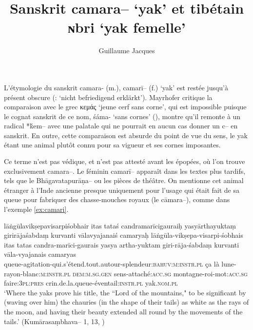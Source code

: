 \documentclass[oldfontcommands,oneside,a4paper,11pt]{article}
\newcommand{\ipa}[1]{{\phon #1}} %
\newcommand{\grec}[1]{{\mleccha #1}}
\begin{document}
 
\title{Sanskrit \ipa{camara--} `yak' et tibétain \ipa{ɴbri} `yak femelle'}
\author{Guillaume Jacques}
\maketitle
L'étymologie du sanskrit \ipa{camara-} (m.), \ipa{camarī--} (f.) `yak' est restée jusqu'à présent obscure (\citealt[I, 375]{mayrhofer56kurz}: `nicht befriedigend erklärkt'). Mayrhofer critique la comparaison avec le grec \grec{κεμάς} `jeune cerf sans corne', qui est impossible puisque le cognat sanskrit de ce nom, \ipa{śáma-} `sans cornes' (\citealt[II, 289]{mayrhofer56kurz}), montre qu'il remonte à un radical *\ipa{ḱem--} avec une palatale qui ne pourrait en aucun cas donner un \ipa{c--} en sanskrit. En outre, cette comparaison est absurde du point de vue du sens, le yak étant une animal plutôt connu pour sa vigueur et ses cornes imposantes.


Ce terme n'est pas védique, et n'est pas attesté avant les épopées, où l'on trouve exclusivement   \ipa{camara--}.  Le féminin \ipa{camarī--} apparaît dans les textes plus tardifs, tels que le \ipa{Bhāgavatapurāṇa--} ou les pièces de théâtre. On mentionne cet animal étranger à l'Inde ancienne presque uniquement pour l'usage qui était fait de sa queue pour fabriquer des chasse-mouches royaux (le  \ipa{cāmara--}), comme dans l'exemple \ref{ex:camari}.

\begin{exe}
\ex \label{ex:camari}
\glt lāṅgūlavikṣepavisarpiśobhair itas tataś candramarīcigauraiḥ 
\glt yasyārthayuktaṃ girirājaśabdaṃ kurvanti vālavyajanaiś camaryaḥ 
\gll lāṅgūla-vikṣepa-visarpi-śobhais itas tatas candra-marīci-gaurais yasya artha-yuktam giri-rāja-śabdaṃ kurvanti vāla-vyajanais camaryas \\
queue-agitation-qui.s'étend.tout.autour-splendeur:\textsc{bahuv:m:instr.pl} ça là lune-rayon-blanc:\textsc{m:instr.pl} \textsc{dem:m.sg.gen} sens-attaché:\textsc{acc.sg} montagne-roi-mot:\textsc{acc.sg} faire:\textsc{3pl:pres} crin.de.la.queue-éventail\textsc{:instr.pl} yak.\textsc{nom.pl} \\
\glt  `Where the yaks prove his title, the ``Lord of the mountains,"  to be significant by (waving over him) the chauries (in the shape of their tails) as white as the rays of the moon, and having their beauty extended all round by the movements of the tails.' (\ipa{Kumārasaṃbhava--} 1, 13, \citealt[204]{kale17kumarasambhava})
\end{exe}
\end{document}
